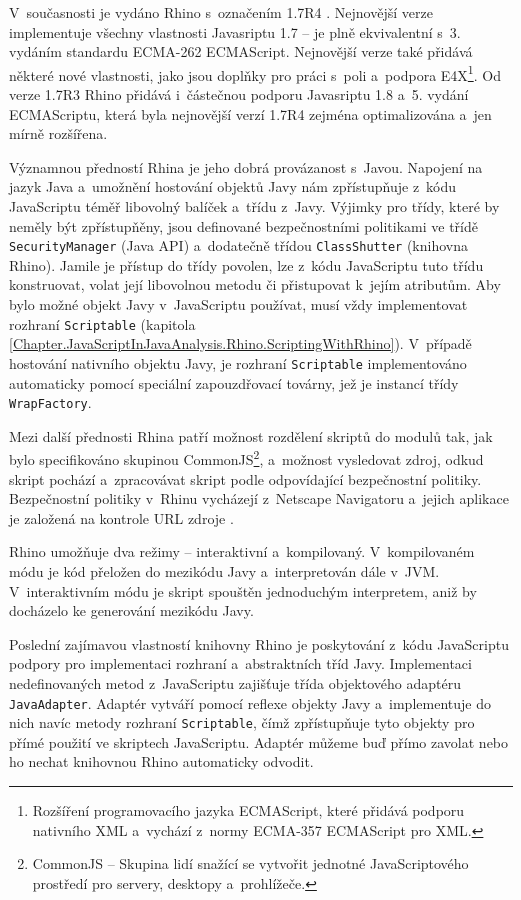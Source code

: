 V~současnosti je vydáno Rhino s~označením 1.7R4 \cite{Bibliography.Rhino.v17R3,Bibliography.Rhino.v17R4}. Nejnovější verze implementuje všechny vlastnosti Javasriptu 1.7 -- je plně ekvivalentní s~3. vydáním standardu \linebreak ECMA-262 ECMAScript. Nejnovější verze také přidává některé nové vlastnosti, jako jsou doplňky pro práci s~poli a~podpora E4X\footnote{Rozšíření programovacího jazyka ECMAScript, které přidává podporu nativního XML a~vychází z~normy ECMA-357 ECMAScript pro XML.}. Od verze 1.7R3 Rhino přidává i~částečnou podporu Javasriptu 1.8 a~5. vydání ECMAScriptu, která byla nejnovější verzí 1.7R4 zejména optimalizována a~jen mírně rozšířena.

Významnou předností Rhina je jeho dobrá provázanost s~Javou. Napojení na jazyk Java a~umožnění hostování objektů Javy nám zpřístupňuje z~kódu JavaScriptu téměř libovolný balíček a~třídu z~Javy. Výjimky pro třídy, které by neměly být zpřístupňěny, jsou definované bezpečnostními politikami ve třídě \texttt{SecurityManager} (Java API) a~dodatečně třídou \texttt{ClassShutter} (knihovna Rhino). Jamile je přístup do třídy povolen, lze z~kódu JavaScriptu tuto třídu konstruovat, volat její libovolnou metodu či přistupovat k~jejím atributům. Aby bylo možné objekt Javy v~JavaScriptu používat, musí vždy implementovat rozhraní \texttt{Scriptable} (kapitola \ref{Chapter.JavaScriptInJavaAnalysis.Rhino.ScriptingWithRhino}). V~případě hostování nativního objektu Javy, je rozhraní \texttt{Scriptable} implementováno automaticky pomocí speciální zapouzdřovací továrny, jež je instancí třídy \texttt{WrapFactory}. 

Mezi další přednosti Rhina patří možnost rozdělení skriptů do modulů tak, jak bylo specifikováno skupinou CommonJS\footnote{CommonJS -- Skupina lidí snažící se vytvořit jednotné JavaScriptového prostředí pro servery, desktopy a~prohlížeče.}, a~možnost vysledovat zdroj, odkud skript pochází a~zpracovávat skript podle odpovídající bezpečnostní politiky. Bezpečnostní politiky v~Rhinu vycházejí z~Netscape Navigatoru a~jejich aplikace je založená na kontrole URL zdroje \cite{Bibliography.Rhino.Overview}.

Rhino umožňuje dva režimy -- interaktivní a~kompilovaný. V~kompilovaném módu je kód přeložen do mezikódu Javy a~interpretován dále v~JVM. V~interaktivním módu je skript spouštěn jednoduchým interpretem, aniž by docházelo ke generování mezikódu Javy.

Poslední zajímavou vlastností knihovny Rhino je poskytování z~kódu JavaScriptu podpory pro implementaci rozhraní a~abstraktních tříd Javy. Implementaci nedefinovaných metod z~JavaScriptu zajišťuje třída objektového adaptéru \texttt{JavaAdapter}. Adaptér vytváří pomocí reflexe objekty Javy a~implementuje do nich navíc metody rozhraní \texttt{Scriptable}, čímž zpřístupňuje tyto objekty pro přímé použití ve skriptech JavaScriptu. Adaptér můžeme buď přímo zavolat nebo ho nechat knihovnou Rhino automaticky odvodit. 

